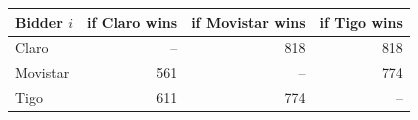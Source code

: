 \begin{tabular}{lrrr}
\toprule
Bidder $i$ & if Claro wins & if Movistar wins & if Tigo wins \\
\midrule
Claro & -- & 818 & 818 \\
Movistar & 561 & -- & 774 \\
Tigo & 611 & 774 & -- \\
\bottomrule
\end{tabular}
